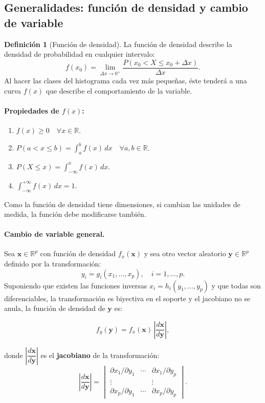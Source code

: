 \documentclass[12pt, a4paper]{article}
\theoremstyle{plain}
\theoremstyle{definition}
\newtheorem{definicion}[teorema]{Definición}
\theoremstyle{remark}
\newcommand{\R}{\mathbb{R}}
\begin{document}
\subsection{Generalidades: función de densidad y cambio de variable}

\begin{definicion}[Función de densidad]
La función de densidad describe la densidad de probabilidad en cualquier
intervalo:
\[
  f(x_0)=\lim_{\Delta x\to 0^+}
  \frac{P(x_0 < X \le x_0+\Delta x)}{\Delta x}.
\]
Al hacer las clases del histograma cada vez más pequeñas, éste tenderá a una
curva $f(x)$ que describe el comportamiento de la variable.
\end{definicion}

\paragraph{Propiedades de $f(x)$:}
\begin{enumerate}
  \item $f(x)\ge0\quad\forall x\in\R$.
  \item $P(a<x\le b) = \displaystyle\int_a^b f(x)\,dx\quad\forall a,b\in\R$.
  \item $P(X\le x) = \displaystyle\int_{-\infty}^x f(x)\,dx$.
  \item $\displaystyle\int_{-\infty}^{+\infty}f(x)\,dx = 1$.
\end{enumerate}

Como la función de densidad tiene dimensiones, si cambian las unidades de
medida, la función debe modificarse también.

\paragraph{Cambio de variable general.}
Sea $\mathbf{x}\in\R^p$ con función de densidad $f_x(\mathbf{x})$ y sea otro
vector aleatorio $\mathbf{y}\in\R^p$ definido por la transformación:
\[
  y_i = g_i(x_1,\dots,x_p), \quad i=1,\dots,p.
\]
Suponiendo que existen las funciones inversas $x_i = h_i(y_1,\dots,y_p)$ y
que todas son diferenciables, la transformación es biyectiva en el soporte y
el jacobiano no se anula, la función de densidad de $\mathbf{y}$ es:
\begin{mdframed}[style=resultado]
\[
  f_y(\mathbf{y}) = f_x(\mathbf{x})\,\left|\frac{d\mathbf{x}}{d\mathbf{y}}\right|,
\]
\end{mdframed}
donde $\left|\dfrac{d\mathbf{x}}{d\mathbf{y}}\right|$ es el \textbf{jacobiano}
de la transformación:
\[
  \left|\frac{d\mathbf{x}}{d\mathbf{y}}\right|
  = \begin{vmatrix}
      \partial x_1/\partial y_1 & \cdots & \partial x_1/\partial y_p \\
      \vdots & & \vdots \\
      \partial x_p/\partial y_1 & \cdots & \partial x_p/\partial y_p
    \end{vmatrix}.
\]
\end{document}
